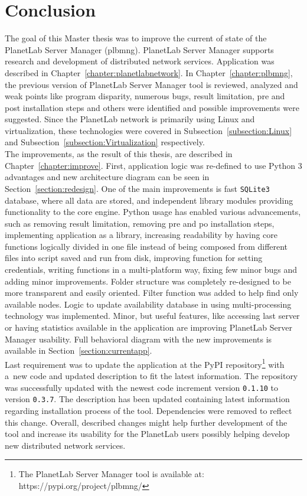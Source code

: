 \chapter{Conclusion}
The goal of this Master thesis was to improve the current of state of the PlanetLab Server Manager (plbmng). PlanetLab Server Manager supports research and development of distributed network services. Application was described in Chapter~\ref{chapter:planetlabnetwork}. In Chapter~\ref{chapter:plbmng}, the previous version of PlanetLab Server Manager tool is reviewed, analyzed and weak points like program disparity, numerous bugs, result limitation, pre and post installation steps and others were identified and possible improvements were suggested. Since the PlanetLab network is primarily using Linux and virtualization, these technologies were covered in Subsection~\ref{subsection:Linux} and Subsection~\ref{subsection:Virtualization} respectively.\\
The improvements, as the result of this thesis, are described in Chapter~\ref{chapter:improve}. First, application logic was re-defined to use Python 3 advantages and new architecture diagram can be seen in Section~\ref{section:redesign}. One of the main improvements is fast \texttt{SQLite3} database, where all data are stored, and independent library modules providing functionality to the core engine. Python usage has enabled various advancements, such as removing result limitation, removing pre and po installation steps, implementing application as a library, increasing readability by having core functions logically divided in one file instead of being composed from different files into script saved and run from disk, improving function for setting credentials, writing functions in a multi-platform way, fixing few minor bugs and adding minor improvements. Folder structure was completely re-designed to be more transparent and easily oriented. Filter function was added to help find only available nodes. Logic to update availability database in using multi-processing technology was implemented. Minor, but useful features, like accessing last server or having statistics available in the application are improving PlanetLab Server Manager usability. Full behavioral diagram with the new improvements is available in Section~\ref{section:currentapp}.\\
Last requirement was to update the application at the PyPI repository\footnote{The PlanetLab Server Manager tool is available at: https://pypi.org/project/plbmng/} with a~new code and updated description to fit the latest information. The repository was successfully updated with the newest code increment version \texttt{0.1.10} to version \texttt{0.3.7}. The description has been updated containing latest information regarding installation process of the tool. Dependencies were removed to reflect this change. Overall, described changes might help further development of the tool and increase its usability for the PlanetLab users possibly helping develop new distributed network services.